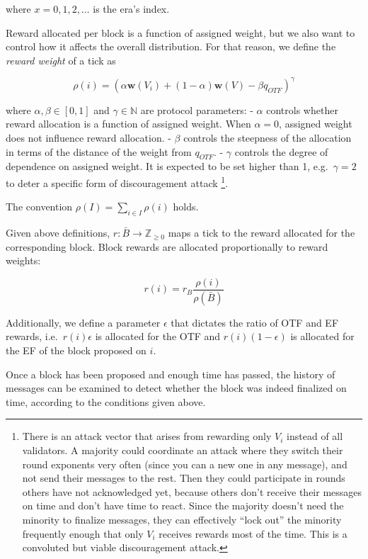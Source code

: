 where $x=0,1,2,\dots$ is the era's index.

Reward allocated per block is a function of assigned weight, but we also want to control how it affects the overall distribution. For that reason, we define the \emph{reward weight} of a tick as

\begin{equation}
  \rho(i) = (\alpha\boldsymbol{w}(V_i)+(1-\alpha)\boldsymbol{w}(V)-\beta q_{OTF})^\gamma
\end{equation}

where $\alpha,\beta\in [0,1]$ and $\gamma\in\mathbb{N}$ are protocol parameters: - $\alpha$ controls whether reward allocation is a function of assigned weight. When $\alpha=0$, assigned weight does not influence reward allocation. - $\beta$ controls the steepness of the allocation in terms of the distance of the weight from $q_{OTF}$. - $\gamma$ controls the degree of dependence on assigned weight. It is expected to be set higher than 1, e.g.~$\gamma=2$ to deter a specific form of discouragement attack \footnote{There is an attack vector that arises from rewarding only $V_i$ instead of all validators. A majority could coordinate an attack where they switch their round exponents very often (since you can a new one in any message), and not send their messages to the rest. Then they could participate in rounds others have not acknowledged yet, because others don't receive their messages on time and don't have time to react. Since the majority doesn't need the minority to finalize messages, they can effectively ``lock out'' the minority frequently enough that only $V_i$ receives rewards most of the time. This is a convoluted but viable discouragement attack.}.

The convention $\rho(I)=\sum_{i \in I} \rho(i)$ holds.

Given above definitions, $r:\bar{B}\to \mathbb{Z}_{\geq 0}$ maps a tick to the reward allocated for the corresponding block. Block rewards are allocated proportionally to reward weights:

\begin{equation}
  r(i) = r_B \frac{\rho(i)}{\rho(\bar{B})}
\end{equation}

Additionally, we define a parameter $\epsilon$ that dictates the ratio of OTF and EF rewards, i.e.~$r(i)\epsilon$ is allocated for the OTF and $r(i)(1-\epsilon)$ is allocated for the EF of the block proposed on $i$.

Once a block has been proposed and enough time has passed, the history of messages can be examined to detect whether the block was indeed finalized on time, according to the conditions given above.

